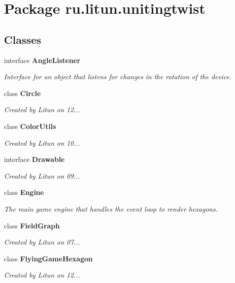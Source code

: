 \section{Package ru.\+litun.\+unitingtwist}
\label{namespaceru_1_1litun_1_1unitingtwist}
\subsection*{Classes}
\begin{DoxyCompactItemize}
\item 
interface \textbf{ Angle\+Listener}
\begin{DoxyCompactList}\small\item\em Interface for an object that listens for changes in the rotation of the device. \end{DoxyCompactList}\item 
class \textbf{ Circle}
\begin{DoxyCompactList}\small\item\em Created by Litun on 12... \end{DoxyCompactList}\item 
class \textbf{ Color\+Utils}
\begin{DoxyCompactList}\small\item\em Created by Litun on 10... \end{DoxyCompactList}\item 
interface \textbf{ Drawable}
\begin{DoxyCompactList}\small\item\em Created by Litun on 09... \end{DoxyCompactList}\item 
class \textbf{ Engine}
\begin{DoxyCompactList}\small\item\em The main game engine that handles the event loop to render hexagons. \end{DoxyCompactList}\item 
class \textbf{ Field\+Graph}
\begin{DoxyCompactList}\small\item\em Created by Litun on 07... \end{DoxyCompactList}\item 
class \textbf{ Flying\+Game\+Hexagon}
\begin{DoxyCompactList}\small\item\em Created by Litun on 12... \end{DoxyCompactList}\item 

\end{DoxyCompactItemize}
